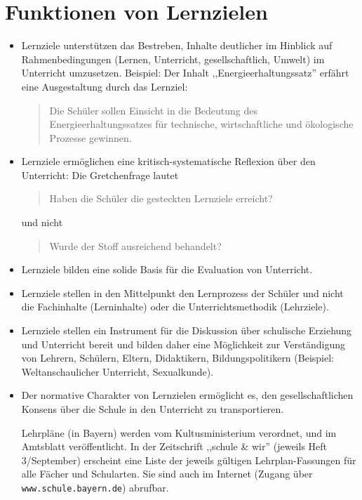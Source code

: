 \section{Funktionen von Lernzielen}
\begin{itemize}
	\item
	Lernziele unterst\"{u}tzen das Bestreben, Inhalte deutlicher
	im Hinblick auf Rahmenbedingungen (Lernen, Unterricht,
	gesellschaftlich, Umwelt) im Unterricht umzusetzen.
	\mip
	Beispiel: Der Inhalt ,,Energieerhaltungssatz'' erf\"{a}hrt 
	eine Ausgestaltung durch das Lernziel:
	\begin{quote}
		Die Sch\"{u}ler sollen Einsicht in die Bedeutung des
		Energieerhaltungssatzes f\"{u}r technische, wirtschaftliche und
		\"{o}kologische Prozesse gewinnen.
	\end{quote}
	\item
	Lernziele erm\"{o}glichen eine kritisch-systematische Reflexion
	\"{u}ber den Unterricht: Die Gretchenfrage lautet
	\begin{quote}
		Haben die Schüler die gesteckten Lernziele erreicht?
	\end{quote}
	und nicht
	\begin{quote}
		Wurde der Stoff ausreichend behandelt?
	\end{quote}
	
	\item
	Lernziele bilden eine solide Basis f\"{u}r die Evaluation von Unterricht.
	\item
	Lernziele stellen in den Mittelpunkt den Lernprozess der
	Sch\"{u}ler und nicht die Fachinhalte (Lerninhalte) oder
	die Unterrichtsmethodik (Lehrziele).
	\item
	Lernziele stellen ein Instrument f\"{u}r die Diskussion \"{u}ber
	schulische Erziehung und Unterricht bereit und bilden
	daher eine M\"{o}glichkeit zur Verst\"{a}ndigung von Lehrern,
	Sch\"{u}lern, Eltern, Didaktikern, Bildungspolitikern
	(Beispiel: Weltanschaulicher Unterricht, Sexualkunde).
	\item
	Der normative Charakter von Lernzielen erm\"{o}glicht es, den
	gesellschaftlichen Konsens \"{u}ber die Schule in den Unterricht zu
	transportieren.
	
	\mip
	Lehrpl\"{a}ne (in Bayern) werden vom Kultusministerium verordnet,
	und im Amtsblatt ver\"{o}ffentlicht.
	In der Zeitschrift ,,schule \& wir'' (jeweils Heft
	3/September) erscheint eine Liste der jeweils g\"{u}ltigen
	Lehrplan-Fassungen f\"{u}r alle F\"{a}cher und Schularten.
	Sie sind auch im Internet (Zugang \"{u}ber {\tt www.schule.bayern.de})
	abrufbar.
\end{itemize}

